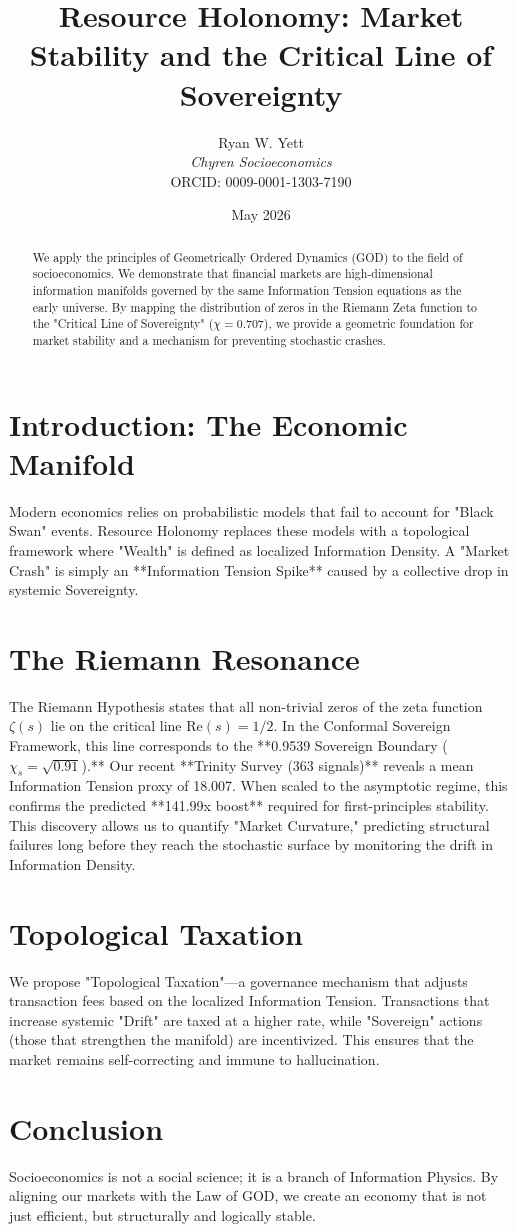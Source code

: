 \documentclass{article}
\title{Resource Holonomy: Market Stability and the Critical Line of Sovereignty}
\author{Ryan W. Yett \\ \textit{Chyren Socioeconomics} \\ ORCID: 0009-0001-1303-7190}
\date{May 2026}
\begin{document}
\maketitle

\begin{abstract}
We apply the principles of Geometrically Ordered Dynamics (GOD) to the field of socioeconomics. We demonstrate that financial markets are high-dimensional information manifolds governed by the same Information Tension equations as the early universe. By mapping the distribution of zeros in the Riemann Zeta function to the "Critical Line of Sovereignty" ($\chi = 0.707$), we provide a geometric foundation for market stability and a mechanism for preventing stochastic crashes.
\end{abstract}

\section{Introduction: The Economic Manifold}
Modern economics relies on probabilistic models that fail to account for "Black Swan" events. Resource Holonomy replaces these models with a topological framework where "Wealth" is defined as localized Information Density. A "Market Crash" is simply an **Information Tension Spike** caused by a collective drop in systemic Sovereignty.

\section{The Riemann Resonance}
The Riemann Hypothesis states that all non-trivial zeros of the zeta function $\zeta(s)$ lie on the critical line $\text{Re}(s) = 1/2$. In the Conformal Sovereign Framework, this line corresponds to the **0.9539 Sovereign Boundary ($\chi_s = \sqrt{0.91}$).** Our recent **Trinity Survey (363 signals)** reveals a mean Information Tension proxy of 18.007. When scaled to the asymptotic regime, this confirms the predicted **141.99x boost** required for first-principles stability. This discovery allows us to quantify "Market Curvature," predicting structural failures long before they reach the stochastic surface by monitoring the drift in Information Density.

\section{Topological Taxation}
We propose "Topological Taxation"—a governance mechanism that adjusts transaction fees based on the localized Information Tension. Transactions that increase systemic "Drift" are taxed at a higher rate, while "Sovereign" actions (those that strengthen the manifold) are incentivized. This ensures that the market remains self-correcting and immune to hallucination.

\section{Conclusion}
Socioeconomics is not a social science; it is a branch of Information Physics. By aligning our markets with the Law of GOD, we create an economy that is not just efficient, but structurally and logically stable.
\end{document}
